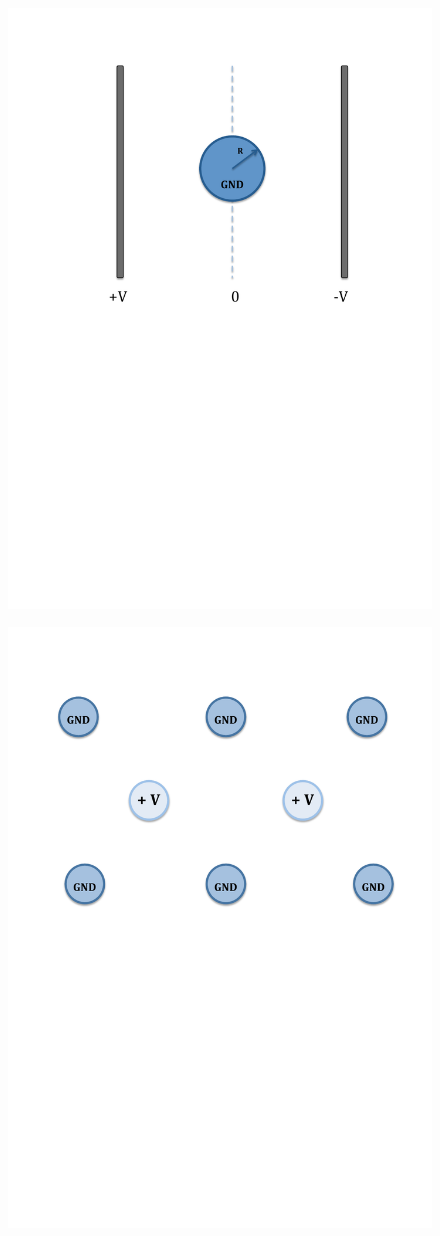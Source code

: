 \documentclass{report}
\begin{document}
\begin{figure}[h!]
\centering
\begin{minipage}{.5\textwidth}
  \centering
  \includegraphics[width=.5\linewidth]{GPdiagramA}
  \label{fig:test1}
\end{minipage}%
\begin{minipage}{.5\textwidth}
  \centering
  \includegraphics[width=.5\linewidth]{GPdiagramE}
  \label{fig:test2}
\end{minipage}
\end{figure}
\end{document}
